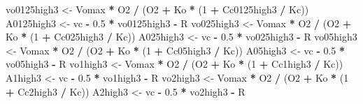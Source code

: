 \documentclass[
]{krantz}
\makeatletter
\newenvironment{Shaded}{\begin{snugshade}}{\end{snugshade}}
\newcommand{\DecValTok}[1]{\textcolor[rgb]{0.00,0.00,0.81}{#1}}
\newcommand{\FloatTok}[1]{\textcolor[rgb]{0.00,0.00,0.81}{#1}}
\newcommand{\NormalTok}[1]{#1}
\newcommand{\OperatorTok}[1]{\textcolor[rgb]{0.81,0.36,0.00}{\textbf{#1}}}
\newcommand{\StringTok}[1]{\textcolor[rgb]{0.31,0.60,0.02}{#1}}
\newenvironment{kframe}{%
\medskip{}
\setlength{\fboxsep}{.8em}
 \def\at@end@of@kframe{}%
 \ifinner\ifhmode%
  \def\at@end@of@kframe{\end{minipage}}%
  \begin{minipage}{\columnwidth}%
 \fi\fi%
 \def\FrameCommand##1{\hskip\@totalleftmargin \hskip-\fboxsep
 \colorbox{shadecolor}{##1}\hskip-\fboxsep
     \hskip-\linewidth \hskip-\@totalleftmargin \hskip\columnwidth}%
 \MakeFramed {\advance\hsize-\width
   \@totalleftmargin\z@ \linewidth\hsize
   \@setminipage}}%
 {\par\unskip\endMakeFramed%
 \at@end@of@kframe}
\renewenvironment{Shaded}{\begin{kframe}}{\end{kframe}}
\makeatother
\begin{document}
\begin{Shaded}
\begin{Highlighting}[]
\NormalTok{vo0125high3 \textless{}{-}}\StringTok{ }\NormalTok{Vomax }\OperatorTok{*}\StringTok{ }\NormalTok{O2 }\OperatorTok{/}\StringTok{ }\NormalTok{(O2 }\OperatorTok{+}\StringTok{ }\NormalTok{Ko }\OperatorTok{*}\StringTok{ }\NormalTok{(}\DecValTok{1} \OperatorTok{+}\StringTok{ }\NormalTok{Cc0125high3 }\OperatorTok{/}\StringTok{ }\NormalTok{Kc)) }
\NormalTok{A0125high3 \textless{}{-}}\StringTok{ }\NormalTok{vc }\OperatorTok{{-}}\StringTok{ }\FloatTok{0.5} \OperatorTok{*}\StringTok{ }\NormalTok{vo0125high3 }\OperatorTok{{-}}\StringTok{ }\NormalTok{R }
\NormalTok{vo025high3 \textless{}{-}}\StringTok{ }\NormalTok{Vomax }\OperatorTok{*}\StringTok{ }\NormalTok{O2 }\OperatorTok{/}\StringTok{ }\NormalTok{(O2 }\OperatorTok{+}\StringTok{ }\NormalTok{Ko }\OperatorTok{*}\StringTok{ }\NormalTok{(}\DecValTok{1} \OperatorTok{+}\StringTok{ }\NormalTok{Cc025high3 }\OperatorTok{/}\StringTok{ }\NormalTok{Kc)) }
\NormalTok{A025high3 \textless{}{-}}\StringTok{ }\NormalTok{vc }\OperatorTok{{-}}\StringTok{ }\FloatTok{0.5} \OperatorTok{*}\StringTok{ }\NormalTok{vo025high3 }\OperatorTok{{-}}\StringTok{ }\NormalTok{R }
\NormalTok{vo05high3 \textless{}{-}}\StringTok{ }\NormalTok{Vomax }\OperatorTok{*}\StringTok{ }\NormalTok{O2 }\OperatorTok{/}\StringTok{ }\NormalTok{(O2 }\OperatorTok{+}\StringTok{ }\NormalTok{Ko }\OperatorTok{*}\StringTok{ }\NormalTok{(}\DecValTok{1} \OperatorTok{+}\StringTok{ }\NormalTok{Cc05high3 }\OperatorTok{/}\StringTok{ }\NormalTok{Kc)) }
\NormalTok{A05high3 \textless{}{-}}\StringTok{ }\NormalTok{vc }\OperatorTok{{-}}\StringTok{ }\FloatTok{0.5} \OperatorTok{*}\StringTok{ }\NormalTok{vo05high3 }\OperatorTok{{-}}\StringTok{ }\NormalTok{R }
\NormalTok{vo1high3 \textless{}{-}}\StringTok{ }\NormalTok{Vomax }\OperatorTok{*}\StringTok{ }\NormalTok{O2 }\OperatorTok{/}\StringTok{ }\NormalTok{(O2 }\OperatorTok{+}\StringTok{ }\NormalTok{Ko }\OperatorTok{*}\StringTok{ }\NormalTok{(}\DecValTok{1} \OperatorTok{+}\StringTok{ }\NormalTok{Cc1high3 }\OperatorTok{/}\StringTok{ }\NormalTok{Kc)) }
\NormalTok{A1high3 \textless{}{-}}\StringTok{ }\NormalTok{vc }\OperatorTok{{-}}\StringTok{ }\FloatTok{0.5} \OperatorTok{*}\StringTok{ }\NormalTok{vo1high3 }\OperatorTok{{-}}\StringTok{ }\NormalTok{R }
\NormalTok{vo2high3 \textless{}{-}}\StringTok{ }\NormalTok{Vomax }\OperatorTok{*}\StringTok{ }\NormalTok{O2 }\OperatorTok{/}\StringTok{ }\NormalTok{(O2 }\OperatorTok{+}\StringTok{ }\NormalTok{Ko }\OperatorTok{*}\StringTok{ }\NormalTok{(}\DecValTok{1} \OperatorTok{+}\StringTok{ }\NormalTok{Cc2high3 }\OperatorTok{/}\StringTok{ }\NormalTok{Kc)) }
\NormalTok{A2high3 \textless{}{-}}\StringTok{ }\NormalTok{vc }\OperatorTok{{-}}\StringTok{ }\FloatTok{0.5} \OperatorTok{*}\StringTok{ }\NormalTok{vo2high3 }\OperatorTok{{-}}\StringTok{ }\NormalTok{R }

\end{Highlighting}
\end{Shaded}
\end{document}
